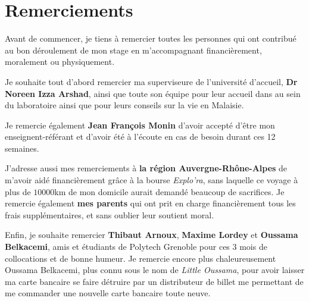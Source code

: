 \chapter*{Remerciements}

Avant de commencer, je tiens à remercier toutes les personnes qui ont contribué au bon déroulement de mon stage en m'accompagnant financièrement, moralement ou physiquement.

Je souhaite tout d'abord remercier ma superviseure de l'université d'accueil, \textbf{Dr Noreen Izza Arshad}, ainsi que toute son équipe pour leur accueil dans au sein du laboratoire ainsi que pour leurs conseils sur la vie en Malaisie.

Je remercie également \textbf{Jean François Monin} d'avoir accepté d'être mon enseignent-référant et d'avoir été à l'écoute en cas de besoin durant ces 12 semaines.

J'adresse aussi mes remerciements à \textbf{la région Auvergne-Rhône-Alpes} de m'avoir aidé financièrement grâce à la bourse \textit{Explo'ra}, sans laquelle ce voyage à plus de $10000$km de mon domicile aurait demandé beaucoup de sacrifices. Je remercie également \textbf{mes parents} qui ont prit en charge financièrement tous les frais supplémentaires, et sans oublier leur soutient moral.

Enfin, je souhaite remercier \textbf{Thibaut Arnoux}, \textbf{Maxime Lordey} et \textbf{Oussama Belkacemi}, amis et étudiants de Polytech Grenoble pour ces 3 mois de collocations et de bonne humeur. Je remercie encore plus chaleureusement Oussama Belkacemi, plus connu sous le nom de \textit{Little Oussama}, pour avoir laisser ma carte bancaire se faire détruire par un distributeur de billet me permettant de me commander une nouvelle carte bancaire toute neuve.
